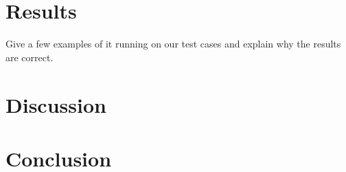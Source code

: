 \documentclass[12pt, titlepage, twoside]{amsart}
\theoremstyle{remark}
\begin{document}
\section{Results}

Give a few examples of it running on our test cases and explain why the results are correct.

\section{Discussion}


\section{Conclusion}
\end{document}
